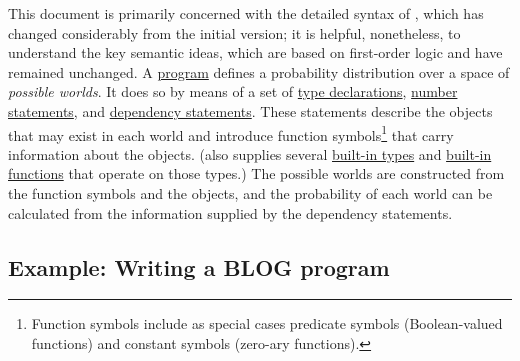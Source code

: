 \documentclass[12pt]{article}
\begin{document}
This document is primarily concerned with the detailed syntax of \bl, which has changed considerably from the initial version;
it is helpful, nonetheless, to understand the key semantic ideas, which are based on first-order logic and have remained unchanged.
A \bl \hyperref[program-section]{program} defines a probability distribution over a space of {\em possible worlds}.
It does so by means of a set of \hyperref[type-declaration-section]{type declarations},
\hyperref[number-section]{number statements}, and \hyperref[dependency-section]{dependency statements}.
These statements describe the objects that may exist in each world and introduce function symbols\footnote{Function symbols include as special cases predicate symbols (Boolean-valued functions) and constant symbols (zero-ary functions).} that carry information about the objects. (\bl also supplies several \hyperref[builtin-type-section]{built-in types}
and \hyperref[builtin-operator-appendix]{built-in functions} that operate on those types.)
The possible worlds are constructed from the function symbols and the objects,
and the probability of each world can be calculated from the information supplied by the dependency statements.

\subsection{Example: Writing a BLOG program}
\end{document}
